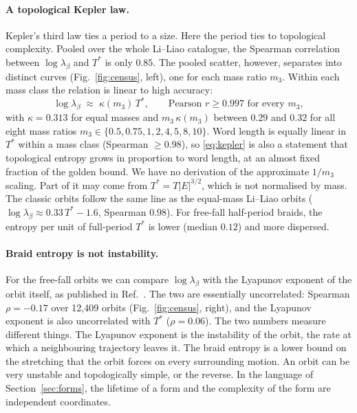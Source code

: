 \documentclass[11pt]{article}
\theoremstyle{remark}
\begin{document}
\paragraph{A topological Kepler law.} Kepler's third law ties a period to a size. Here the period ties to
topological complexity. Pooled over the whole Li--Liao catalogue, the Spearman correlation between
$\log\lambda_\beta$ and $T^*$ is only $0.85$. The pooled scatter, however, separates into distinct curves
(Fig.~\ref{fig:census}, left), one for each mass ratio $m_3$. Within each mass class the relation is linear
to high accuracy:
\begin{equation}
  \log\lambda_\beta\;\approx\;\kappa(m_3)\,T^*,\qquad \text{Pearson } r\ge0.997 \text{ for every } m_3,
  \label{eq:kepler}
\end{equation}
with $\kappa=0.313$ for equal masses and $m_3\,\kappa(m_3)$ between $0.29$ and $0.32$ for all eight mass ratios
$m_3\in\{0.5,0.75,1,2,4,5,8,10\}$. Word length is equally linear in $T^*$ within a mass class (Spearman
$\ge0.98$), so \eqref{eq:kepler} is also a statement that topological entropy grows in proportion to word length,
at an almost fixed fraction of the golden bound. We have no derivation of the approximate $1/m_3$ scaling.
Part of it may come from $T^*=T|E|^{3/2}$, which is not normalised by mass. The classic orbits follow the same
line as the equal-mass Li--Liao orbits ($\log\lambda_\beta\approx0.33\,T^*-1.6$, Spearman $0.98$). For free-fall
half-period braids, the entropy per unit of full-period $T^*$ is lower (median $0.12$) and more dispersed.

\paragraph{Braid entropy is not instability.} For the free-fall orbits we can compare $\log\lambda_\beta$ with
the Lyapunov exponent of the orbit itself, as published in Ref.~\cite{Hristov2024}. The two are essentially
uncorrelated: Spearman $\rho=-0.17$ over 12{,}409 orbits (Fig.~\ref{fig:census}, right), and the Lyapunov
exponent is also uncorrelated with $T^*$ ($\rho=0.06$). The two numbers measure different things. The Lyapunov
exponent is the instability of the orbit, the rate at which a neighbouring trajectory leaves it. The braid
entropy is a lower bound on the stretching that the orbit forces on every surrounding motion. An orbit can be
very unstable and topologically simple, or the reverse. In the language of
Section~\ref{sec:forms}, the lifetime of a form and the complexity of the form are independent coordinates.
\end{document}
